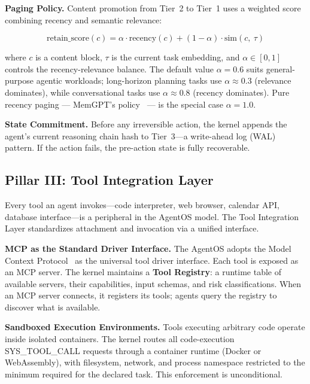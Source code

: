 \documentclass[journal]{IEEEtran}
\begin{document}
\textbf{Paging Policy.} Content promotion from Tier~2 to Tier~1 uses a weighted score combining recency and semantic relevance:

\begin{equation}
  \text{retain\_score}(c) = \alpha \cdot \text{recency}(c) + (1-\alpha) \cdot \text{sim}(c,\ \tau)
  \label{eq:paging}
\end{equation}

where $c$ is a content block, $\tau$ is the current task embedding, and $\alpha \in [0,1]$ controls the recency-relevance balance. The default value $\alpha = 0.6$ suits general-purpose agentic workloads; long-horizon planning tasks use $\alpha \approx 0.3$ (relevance dominates), while conversational tasks use $\alpha \approx 0.8$ (recency dominates). Pure recency paging --- MemGPT's policy~\cite{packer2023memgpt} --- is the special case $\alpha = 1.0$.

\textbf{State Commitment.} Before any irreversible action, the kernel appends the agent's current reasoning chain hash to Tier~3---a write-ahead log (WAL) pattern. If the action fails, the pre-action state is fully recoverable.

\subsection{Pillar III: Tool Integration Layer}
\label{sec:tools}

Every tool an agent invokes---code interpreter, web browser, calendar API, database interface---is a peripheral in the AgentOS model. The Tool Integration Layer standardizes attachment and invocation via a unified interface.

\textbf{MCP as the Standard Driver Interface.} The AgentOS adopts the Model Context Protocol~\cite{anthropic2024mcp} as the universal tool driver interface. Each tool is exposed as an MCP server. The kernel maintains a \textbf{Tool Registry}: a runtime table of available servers, their capabilities, input schemas, and risk classifications. When an MCP server connects, it registers its tools; agents query the registry to discover what is available.

\textbf{Sandboxed Execution Environments.} Tools executing arbitrary code operate inside isolated containers. The kernel routes all code-execution SYS\_TOOL\_CALL requests through a container runtime (Docker or WebAssembly), with filesystem, network, and process namespace restricted to the minimum required for the declared task. This enforcement is unconditional.
\end{document}
